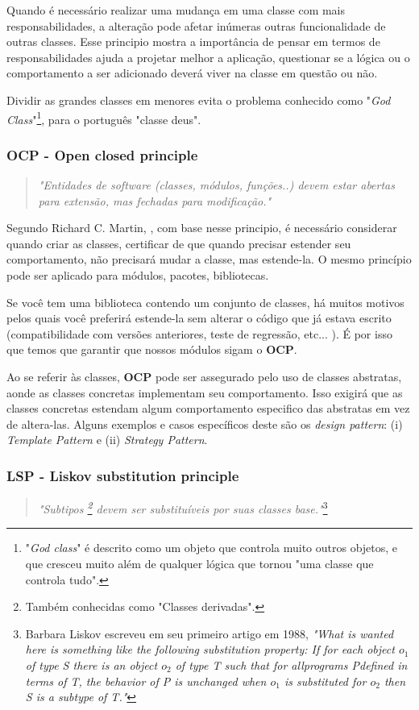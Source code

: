 \documentclass[12pt]{article}
\begin{document}
Quando é necessário realizar uma mudança em uma classe com mais responsabilidades, a alteração pode afetar inúmeras outras funcionalidade de outras classes. Esse principio mostra a importância de pensar em termos de responsabilidades ajuda a projetar melhor a aplicação, questionar se a lógica ou o comportamento a ser adicionado deverá viver na classe em questão ou não.

Dividir as grandes classes em menores evita o problema conhecido como "\textit{God Class}"\footnote{"\textit{God class}" é descrito como um objeto que controla muito outros objetos, e que cresceu muito além de qualquer lógica que tornou "uma classe que controla tudo".}\cite{GOD_CLASS}, para o português "classe deus". 


\subsubsection{OCP - Open closed principle}

\begin{quote}
	\textit{"Entidades de software (classes, módulos, funções..) devem estar abertas para extensão, mas fechadas para modificação."}	
\end{quote}

Segundo Richard C. Martin, \cite{ROBERT_MARTIN_THE_CLEAN_ARCHITECTURE}, com base nesse principio, é necessário considerar quando criar as classes, certificar de que quando precisar estender seu comportamento, não precisará mudar a classe, mas estende-la. O mesmo princípio pode ser aplicado para módulos, pacotes, bibliotecas.

Se você tem uma biblioteca contendo um conjunto de classes, há muitos motivos pelos quais você preferirá estende-la sem alterar o código que já estava escrito (compatibilidade com versões anteriores, teste de regressão, etc... ). É por isso que temos que garantir que nossos módulos sigam o \textbf{OCP}.

Ao se referir às classes, \textbf{OCP} pode ser assegurado pelo uso de classes abstratas, aonde as classes concretas implementam seu comportamento. Isso exigirá que as classes concretas estendam algum comportamento especifico das abstratas em vez de altera-las. Alguns exemplos e casos específicos deste são os \textit{design pattern}: (i) \textit{Template Pattern} e (ii) \textit{Strategy Pattern}.

\subsubsection{LSP - Liskov substitution principle}
\begin{quote}
	\textit{"Subtipos \footnote{Também conhecidas como "Classes derivadas".} devem ser substituíveis por suas classes base."}\footnote{Barbara Liskov escreveu em seu primeiro artigo em 1988, \textit{"What is wanted here is something like the following substitution property: If for each object $ o_1 $ of type S there is an object $ o_2 $ of type T such that for allprograms Pdefined in terms of T, the behavior of P is unchanged when $ o_1 $ is substituted for $ o_2 $ then S is a subtype of T."} }	
\end{quote}
\end{document}
